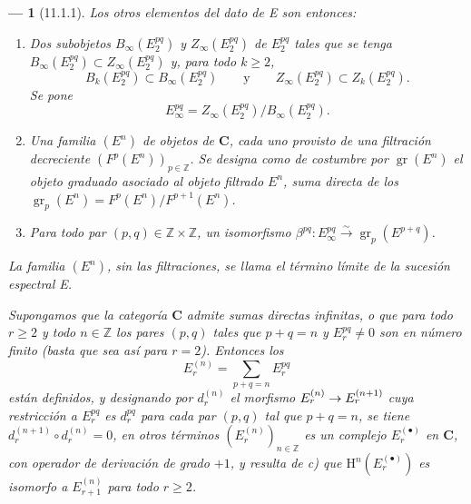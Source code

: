 \documentclass[10pt,oneside,openany]{book}
\theoremstyle{egaenv}\newtheorem*{env}{---}
\theoremstyle{egastatement}
\theoremstyle{egadescription}
\newcommand{\oldpage}[2][]{\marginnote{\normalfont\scriptsize\textbf{#1}\,|\,#2}\ignorespaces}
\renewcommand{\geq}{\geqslant}
\renewcommand{\to}{\mathchoice{\longrightarrow}{\rightarrow}{\rightarrow}{\rightarrow}}
\begin{document}
\begin{env}[11.1.1]
Los otros elementos del dato de E son entonces:
\begin{enumerate}
  \item[$d)$] Dos subobjetos $B_\infty(E_2^{pq})$ y
    $Z_\infty(E_2^{pq})$ de $E_2^{pq}$ tales que se tenga
    $B_\infty(E_2^{pq})\subset Z_\infty(E_2^{pq})$ y, para todo $k\geq2$,
    \[
      B_k(E_2^{pq})\subset B_\infty(E_2^{pq})
      \qquad\text{y}\qquad
      Z_\infty(E_2^{pq})\subset Z_k(E_2^{pq}).
    \]
    Se pone
    \[
    \label{0.11.1.1.3-fr}
      E_\infty^{pq}=Z_\infty(E_2^{pq})/B_\infty(E_2^{pq}).
      \tag{11.1.1.3}
    \]
  \item[$e)$]
    \oldpage[0\textsubscript{III}]{24}
    Una familia $(E^n)$ de objetos de $\boldsymbol{C}$, cada uno provisto de una
    \emph{filtración decreciente} $(F^p(E^n))_{p\in\mathbb Z}$. Se designa
    como de costumbre por $\operatorname{gr}(E^n)$ el objeto graduado asociado al
    objeto filtrado $E^n$, suma directa de los
    $\operatorname{gr}_p(E^n)=F^p(E^n)/F^{p+1}(E^n)$.
  \item[$f)$] Para todo par $(p,q)\in\mathbb Z\times\mathbb Z$, un
    isomorfismo
    $\beta^{pq}:E_\infty^{pq}\xrightarrow{\sim}
    \operatorname{gr}_p(E^{p+q})$.
\end{enumerate}

La familia $(E^n)$, sin las filtraciones, se llama el \emph{término límite}
de la sucesión espectral E.

Supongamos que la categoría $\boldsymbol{C}$ admite sumas directas infinitas,
o que para todo $r\geq2$ y todo $n\in\mathbb Z$ los pares $(p,q)$ tales
que $p+q=n$ y $E_r^{pq}\ne0$ son en número finito (basta que sea así
para $r=2$). Entonces los
\[
  E_r^{(n)}=\sum_{p+q=n}E_r^{pq}
\]
están definidos, y designando por $d_r^{(n)}$ el morfismo
$E_r^{(n)}\to E_r^{(n+1)}$ cuya restricción a $E_r^{pq}$ es $d_r^{pq}$
para cada par $(p,q)$ tal que $p+q=n$, se tiene
$d_r^{(n+1)}\circ d_r^{(n)}=0$, en otros términos $(E_r^{(n)})_{n\in\mathbb Z}$
es un \emph{complejo $E_r^{(\bullet)}$} en $\boldsymbol{C}$, con operador de
derivación de grado $+1$, y resulta de \emph{c)} que
$\mathrm H^n(E_r^{(\bullet)})$ es \emph{isomorfo a} $E_{r+1}^{(n)}$ para todo
$r\geq2$.
\end{env}
\end{document}
